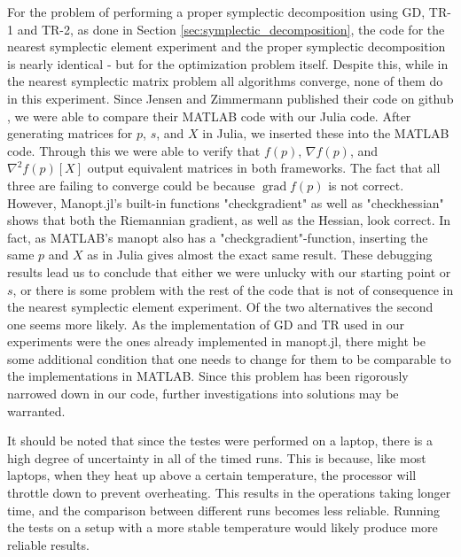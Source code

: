 For the problem of performing a proper symplectic decomposition using GD, TR-1 and TR-2, as done in Section \ref{sec:symplectic_decomposition}, the code for the nearest symplectic element experiment and the proper symplectic decomposition is nearly identical - but for the optimization problem itself. Despite this, while in the nearest symplectic matrix problem all algorithms converge, none of them do in this experiment. Since Jensen and Zimmermann published their code on github \cite[p.~15]{JensenZimmermann2024}, we were able to compare their MATLAB code with our Julia code. After generating matrices for $p$, $s$, and $X$ in Julia, we inserted these into the MATLAB code. Through this we were able to verify that $f(p)$, $\nabla f(p)$, and $\nabla^{2}f(p)[X]$ output equivalent matrices in both frameworks. The fact that all three are failing to converge could be because $\operatorname{grad}f(p)$ is not correct. However, Manopt.jl's built-in functions "checkgradient" as well as "checkhessian" shows that both the Riemannian gradient, as well as the Hessian, look correct. In fact, as MATLAB's manopt also has a "checkgradient"-function, inserting the same $p$ and $X$ as in Julia gives almost the exact same result. These debugging results lead us to conclude that either we were unlucky with our starting point or $s$, or there is some problem with the rest of the code that is not of consequence in the nearest symplectic element experiment. Of the two alternatives the second one seems more likely. As the implementation of GD and TR used in our experiments were the ones already implemented in manopt.jl, there might be some additional condition that one needs to change for them to be comparable to the implementations in MATLAB. Since this problem has been rigorously narrowed down in our code, further investigations into solutions may be warranted.

It should be noted that since the testes were performed on a laptop, there is a high degree of uncertainty in all of the timed runs. This is because, like most laptops, when they heat up above a certain temperature, the processor will throttle down to prevent overheating. This results in the operations taking longer time, and the comparison between different runs becomes less reliable. Running the tests on a setup with a more stable temperature would likely produce more reliable results. 

